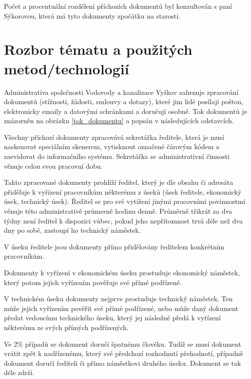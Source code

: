 \documentclass[12pt,a4paper]{article}
\begin{document}
Počet a procentuální rozdělení příchozích dokumentů byl konzultován s paní Sýkorovou, která má tyto dokumenty zpočátku na starosti.


\newpage


\section{Rozbor tématu a použitých metod/technologií}

Administrativa společnosti Vodovody a kanalizace Vyškov zahrnuje zpracování dokumentů (stížnosti, žádosti, smlouvy a dotazy), které jim lidé posílají poštou, elektro\-nicky emaily a datovými schránkami a doručují osobně. Tok dokumentů je znázorněn na obrázku \ref{tok_dokumentu} a popsán v následujících odstavcích.

Všechny příchozí dokumenty zpracovává sekretářka ředitele, která je musí naskenovat speciálním skenerem, vytisknout označené čárovým kódem a zaevidovat do informačního systému. Sekretářka se administrativní činnosti věnuje celou svou pracovní dobu.

Takto zpracované dokumenty prohlíží ředitel, který je dle obsahu či adresáta při\-dě\-lu\-je k vyřízení pracovníkům některému z úseků (úsek ředitele, ekonomický úsek, technický úsek). Ředitel se pro své vytížení jinými pracovními povinnostmi věnuje této administrativě průmerně hodinu denně.
Průměrně třikrát za dva týdny není ředitel k dispozici vůbec, pokud jeho nepřítomnost trvá déle než dva dny po sobě, zastoupí ho technický náměstek.

V úseku ředitele jsou dokumenty přímo přidělovány ředitelem konkrétním pra\-cov\-ní\-kům.

Dokumenty k vyřízení v ekonomickém úseku prostuduje ekonomický náměstek, který potom jejich vyřízením pověřuje své přímé podřízené.

V technickém úseku dokumenty nejprve prostuduje technický náměstek. Ten může jejich vyřízením pověřit své přímé podřízené, nebo může daný dokument předat vedoucímu technického úseku, který jej následně předá k vyřízení některému ze svých přímých podřízených.

Ve 2\% případů se dokument doručí špatnému člověku. Tudíž se musí dokument vrátit zpět k nadřízenému, který své předchozí rozhodnutí přehodnotí, případně dokument doručí řediteli či přímo náměstkovi druhého úseku. Dokument se tak déle zdrží.
\end{document}
